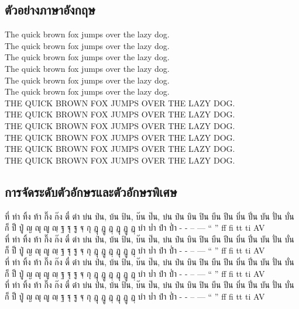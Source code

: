 \documentclass[twocolumn,a4paper]{article}
\begin{document}
\subsection{ตัวอย่างภาษาอังกฤษ}
The quick brown fox jumps over the lazy dog.\\
The quick brown fox jumps over the lazy dog.\\
The quick brown fox jumps over the lazy dog.\\
The quick brown fox jumps over the lazy dog.\\
The quick brown fox jumps over the lazy dog.\\
The quick brown fox jumps over the lazy dog.\\
\MakeUppercase{The quick brown fox jumps over the lazy dog.}\\
\MakeUppercase{The quick brown fox jumps over the lazy dog.}\\
\MakeUppercase{The quick brown fox jumps over the lazy dog.}\\
\MakeUppercase{The quick brown fox jumps over the lazy dog.}\\
\MakeUppercase{The quick brown fox jumps over the lazy dog.}\\
\MakeUppercase{The quick brown fox jumps over the lazy dog.}\\



\subsection{การจัดระดับตัวอักษรและตัวอักษรพิเศษ}
\noindent
{}
ที่ ท่า ทิ้ง ท้า กิ๊ง ก๊ง ตี๋ ต๋า บ่น ป่น, บ้น ป้น, บ๊น ป๊น, บ๋น ป๋น บิน ปิน บีน ปีน บิ่น ปิ่น บัน ปั่น บั่น ก็ ป็ ปู่ ญ ญุ ญู ญฺ ฐ ฐุ ฐู ฐฺ กุ ฎุ ฎู ฎฺ ฏุ ฏู ฏฺ บำ บ่ำ ปำ ป่ำ -\textyamakkan{} \textfongmun{} \textangkhankhu{} \textkhomut{} - -- --- `` '' ff fi tt ti AV\\
ที่ ท่า ทิ้ง ท้า กิ๊ง ก๊ง ตี๋ ต๋า บ่น ป่น, บ้น ป้น, บ๊น ป๊น, บ๋น ป๋น บิน ปิน บีน ปีน บิ่น ปิ่น บัน ปั่น บั่น ก็ ป็ ปู่ ญ ญุ ญู ญฺ ฐ ฐุ ฐู ฐฺ กุ ฎุ ฎู ฎฺ ฏุ ฏู ฏฺ บำ บ่ำ ปำ ป่ำ -\textyamakkan{} \textfongmun{} \textangkhankhu{} \textkhomut{} - -- --- `` '' ff fi tt ti AV\\
ที่ ท่า ทิ้ง ท้า กิ๊ง ก๊ง ตี๋ ต๋า บ่น ป่น, บ้น ป้น, บ๊น ป๊น, บ๋น ป๋น บิน ปิน บีน ปีน บิ่น ปิ่น บัน ปั่น บั่น ก็ ป็ ปู่ ญ ญุ ญู ญฺ ฐ ฐุ ฐู ฐฺ กุ ฎุ ฎู ฎฺ ฏุ ฏู ฏฺ บำ บ่ำ ปำ ป่ำ -\textyamakkan{} \textfongmun{} \textangkhankhu{} \textkhomut{} - -- --- `` '' ff fi tt ti AV\\
ที่ ท่า ทิ้ง ท้า กิ๊ง ก๊ง ตี๋ ต๋า บ่น ป่น, บ้น ป้น, บ๊น ป๊น, บ๋น ป๋น บิน ปิน บีน ปีน บิ่น ปิ่น บัน ปั่น บั่น ก็ ป็ ปู่ ญ ญุ ญู ญฺ ฐ ฐุ ฐู ฐฺ กุ ฎุ ฎู ฎฺ ฏุ ฏู ฏฺ บำ บ่ำ ปำ ป่ำ -\textyamakkan{} \textfongmun{} \textangkhankhu{} \textkhomut{} - -- --- `` '' ff fi tt ti AV\\
\end{document}
